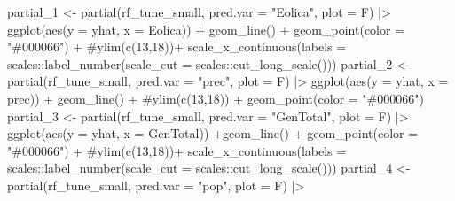 \documentclass[
]{report}
\newenvironment{Shaded}{\begin{snugshade}}{\end{snugshade}}
\newcommand{\AttributeTok}[1]{\textcolor[rgb]{0.40,0.45,0.13}{#1}}
\newcommand{\CommentTok}[1]{\textcolor[rgb]{0.37,0.37,0.37}{#1}}
\newcommand{\FunctionTok}[1]{\textcolor[rgb]{0.28,0.35,0.67}{#1}}
\newcommand{\NormalTok}[1]{\textcolor[rgb]{0.00,0.23,0.31}{#1}}
\newcommand{\OtherTok}[1]{\textcolor[rgb]{0.00,0.23,0.31}{#1}}
\newcommand{\SpecialCharTok}[1]{\textcolor[rgb]{0.37,0.37,0.37}{#1}}
\newcommand{\StringTok}[1]{\textcolor[rgb]{0.13,0.47,0.30}{#1}}
\begin{document}
\begin{Shaded}
\begin{Highlighting}[]
\NormalTok{partial\_1 }\OtherTok{\textless{}{-}} \FunctionTok{partial}\NormalTok{(rf\_tune\_small, }\AttributeTok{pred.var =} \StringTok{"Eolica"}\NormalTok{, }\AttributeTok{plot =}\NormalTok{ F) }\SpecialCharTok{|\textgreater{}} 
  \FunctionTok{ggplot}\NormalTok{(}\FunctionTok{aes}\NormalTok{(}\AttributeTok{y =}\NormalTok{ yhat, }\AttributeTok{x =}\NormalTok{ Eolica)) }\SpecialCharTok{+} \FunctionTok{geom\_line}\NormalTok{() }\SpecialCharTok{+}
  \FunctionTok{geom\_point}\NormalTok{(}\AttributeTok{color =} \StringTok{"\#000066"}\NormalTok{) }\SpecialCharTok{+} \CommentTok{\#ylim(c(13,18))+}
  \FunctionTok{scale\_x\_continuous}\NormalTok{(}\AttributeTok{labels =}\NormalTok{ scales}\SpecialCharTok{::}\FunctionTok{label\_number}\NormalTok{(}\AttributeTok{scale\_cut =}\NormalTok{ scales}\SpecialCharTok{::}\FunctionTok{cut\_long\_scale}\NormalTok{()))}
\NormalTok{partial\_2 }\OtherTok{\textless{}{-}} \FunctionTok{partial}\NormalTok{(rf\_tune\_small, }\AttributeTok{pred.var =} \StringTok{"prec"}\NormalTok{, }\AttributeTok{plot =}\NormalTok{ F) }\SpecialCharTok{|\textgreater{}} 
  \FunctionTok{ggplot}\NormalTok{(}\FunctionTok{aes}\NormalTok{(}\AttributeTok{y =}\NormalTok{ yhat, }\AttributeTok{x =}\NormalTok{ prec)) }\SpecialCharTok{+} \FunctionTok{geom\_line}\NormalTok{() }\SpecialCharTok{+} \CommentTok{\#ylim(c(13,18)) +}
  \FunctionTok{geom\_point}\NormalTok{(}\AttributeTok{color =} \StringTok{"\#000066"}\NormalTok{) }
\NormalTok{partial\_3 }\OtherTok{\textless{}{-}} \FunctionTok{partial}\NormalTok{(rf\_tune\_small, }\AttributeTok{pred.var =} \StringTok{"GenTotal"}\NormalTok{, }\AttributeTok{plot =}\NormalTok{ F) }\SpecialCharTok{|\textgreater{}} 
  \FunctionTok{ggplot}\NormalTok{(}\FunctionTok{aes}\NormalTok{(}\AttributeTok{y =}\NormalTok{ yhat, }\AttributeTok{x =}\NormalTok{ GenTotal)) }\SpecialCharTok{+}\FunctionTok{geom\_line}\NormalTok{() }\SpecialCharTok{+}
  \FunctionTok{geom\_point}\NormalTok{(}\AttributeTok{color =} \StringTok{"\#000066"}\NormalTok{) }\SpecialCharTok{+} \CommentTok{\#ylim(c(13,18))+}
  \FunctionTok{scale\_x\_continuous}\NormalTok{(}\AttributeTok{labels =}\NormalTok{ scales}\SpecialCharTok{::}\FunctionTok{label\_number}\NormalTok{(}\AttributeTok{scale\_cut =}\NormalTok{ scales}\SpecialCharTok{::}\FunctionTok{cut\_long\_scale}\NormalTok{()))}
\NormalTok{partial\_4 }\OtherTok{\textless{}{-}} \FunctionTok{partial}\NormalTok{(rf\_tune\_small, }\AttributeTok{pred.var =} \StringTok{"pop"}\NormalTok{, }\AttributeTok{plot =}\NormalTok{ F) }\SpecialCharTok{|\textgreater{}} 

\end{Highlighting}
\end{Shaded}
\end{document}
